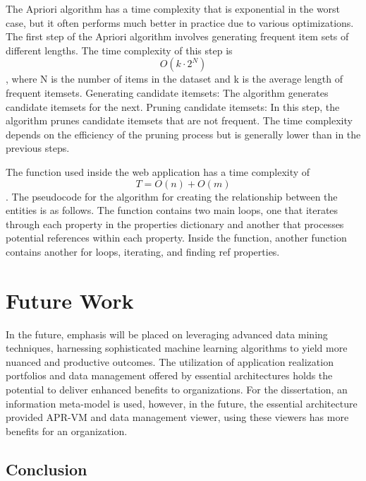 \documentclass{article}
\begin{document}
The Apriori algorithm has a time complexity that is exponential in the worst case, but it often performs much better in practice due to various optimizations. The first step of the Apriori algorithm involves generating frequent item sets of different lengths. The time complexity of this step is \begin{equation}O(k \cdot 2^{N})\end{equation}, where N is the number of items in the dataset and k is the average length of frequent itemsets. Generating candidate itemsets: The algorithm generates candidate itemsets for the next. Pruning candidate itemsets: In this step, the algorithm prunes candidate itemsets that are not frequent. The time complexity depends on the efficiency of the pruning process but is generally lower than in the previous steps. \parencite{xie2008}

The function used inside the web application has a time complexity of \begin{equation}
    T = O(n) + O(m)
\end{equation}. The pseudocode for the algorithm for creating the relationship between the entities is as follows. The function contains two main loops, one that iterates through each property in the properties dictionary and another that processes potential references within each property. Inside the function, another function contains another for loops, iterating, and finding ref properties. 

\clearpage
\maketitle
\section{Future Work}

In the future, emphasis will be placed on leveraging advanced data mining techniques, harnessing sophisticated machine learning algorithms to yield more nuanced and productive outcomes. The utilization of application realization portfolios and data management offered by essential architectures holds the potential to deliver enhanced benefits to organizations. For the dissertation, an information meta-model is used, however, in the future, the essential architecture provided APR-VM and data management viewer, using these viewers has more benefits for an organization.

\subsection{Conclusion}
\end{document}
